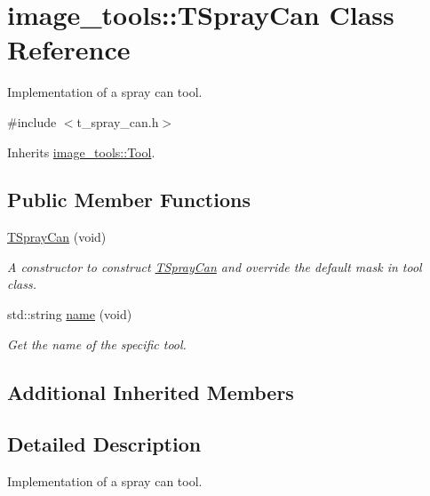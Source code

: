 \hypertarget{classimage__tools_1_1TSprayCan}{}\section{image\+\_\+tools\+:\+:T\+Spray\+Can Class Reference}
\label{classimage__tools_1_1TSprayCan}


Implementation of a spray can tool.  




{\ttfamily \#include $<$t\+\_\+spray\+\_\+can.\+h$>$}



Inherits \hyperlink{classimage__tools_1_1Tool}{image\+\_\+tools\+::\+Tool}.

\subsection*{Public Member Functions}
\begin{DoxyCompactItemize}
\item 
\hyperlink{classimage__tools_1_1TSprayCan_a563411dba403c23c05e5c2c6266b6778}{T\+Spray\+Can} (void)\hypertarget{classimage__tools_1_1TSprayCan_a563411dba403c23c05e5c2c6266b6778}{}\label{classimage__tools_1_1TSprayCan_a563411dba403c23c05e5c2c6266b6778}

\begin{DoxyCompactList}\small\item\em A constructor to construct \hyperlink{classimage__tools_1_1TSprayCan}{T\+Spray\+Can} and override the default mask in tool class. \end{DoxyCompactList}\item 
std\+::string \hyperlink{classimage__tools_1_1TSprayCan_a550d5510cdf8dc826560dcbca9bedbd9}{name} (void)
\begin{DoxyCompactList}\small\item\em Get the name of the specific tool. \end{DoxyCompactList}\end{DoxyCompactItemize}
\subsection*{Additional Inherited Members}


\subsection{Detailed Description}
Implementation of a spray can tool. 

